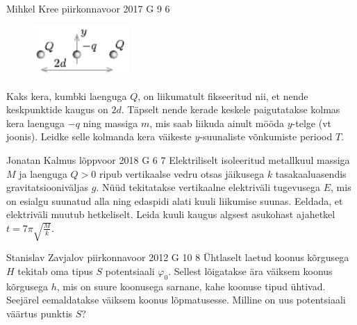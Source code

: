 \documentclass[11pt]{article}
\begin{document}
{%
{Mihkel Kree} %
{piirkonnavoor} %
{2017} %
{G 9} %
{6} %
{
\ifStatement
\begin{figure}
	\vspace{-25pt}
	\begin{center}
		\includegraphics[width=0.32\textwidth]{2017-v2g-09-laengudjoonis.pdf}
	\end{center}
	\vspace{-10pt}
\end{figure}

Kaks kera, kumbki laenguga $Q$, on liikumatult fikseeritud nii, et nende keskpunktide kaugus on $2d$. Täpselt nende kerade keskele paigutatakse kolmas kera laenguga $-q$ ning massiga $m$, mis saab liikuda ainult mööda $y$-telge (vt joonis). Leidke selle kolmanda kera väikeste $y$-suunaliste võnkumiste periood $T$.
\fi
}

{Jonatan Kalmus} %
{lõppvoor} %
{2018} %
{G 6} %
{7} %
{
\ifStatement
Elektriliselt isoleeritud metallkuul massiga $M$ ja laenguga $Q>0$ ripub vertikaalse vedru otsas jäikusega $k$ tasakaaluasendis gravitatsiooniväljas $g$. Nüüd tekitatakse vertikaalne elektriväli tugevusega $E$, mis on esialgu suunatud alla ning edaspidi alati kuuli liikumise suunas. Eeldada, et elektriväli muutub hetkeliselt. Leida kuuli kaugus algsest asukohast ajahetkel $t=7\pi \sqrt{\frac{M}{k}}$.
\fi
}

{Stanislav Zavjalov} %
{piirkonnavoor} %
{2012} %
{G 10} %
{8} %
{
\ifStatement
Ühtlaselt laetud koonus kõrgusega $H$ tekitab oma tipus $S$ potentsiaali
$\varphi_0$. Sellest lõigatakse ära väiksem koonus kõrgusega $h$, mis on suure
koonusega sarnane, kahe koonuse tipud ühtivad. Seejärel eemaldatakse väiksem koonus
lõpmatusesse. Milline on uus potentsiaali väärtus punktis $S$?
\fi
}

}
\end{document}
